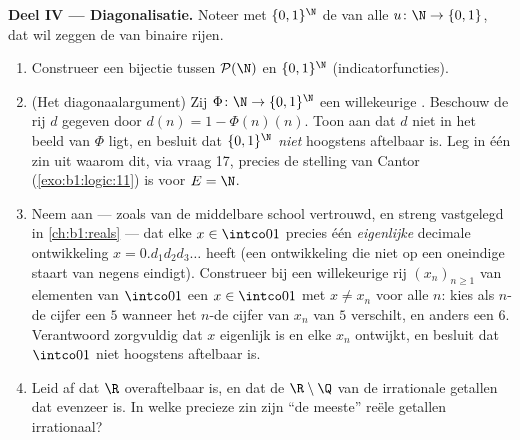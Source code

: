 \begin{problem}
\medskip
\noindent\textbf{Deel IV --- Diagonalisatie.} Noteer met
$\{0,1\}^{\N}$ de  van alle  $u \colon \N \to \{0,
1\}$, dat wil zeggen de  van binaire rijen.
\begin{enumerate}[resume]
  \item Construeer een bijectie tussen $\mathcal{P}(\N)$ en
        $\{0,1\}^{\N}$ (indicatorfuncties).
  \item (Het diagonaalargument) Zij $\Phi \colon \N \to \{0,1\}^{\N}$ een
        willekeurige . Beschouw de rij $d$ gegeven door $d(n) =
        1 - \Phi(n)(n)$. Toon aan dat $d$ niet in het beeld van $\Phi$
        ligt, en besluit dat $\{0,1\}^{\N}$ \emph{niet} hoogstens
        aftelbaar is. Leg in één zin uit waarom dit, via vraag 17,
        precies de stelling van Cantor (\cref{exo:b1:logic:11}) is voor
        $E = \N$.
  \item Neem aan --- zoals van de middelbare school vertrouwd, en
        streng vastgelegd in \cref{ch:b1:reals} --- dat elke $x \in
        \intco01$ precies één \emph{eigenlijke} decimale ontwikkeling $x
        = 0.d_1 d_2 d_3\dots$ heeft (een ontwikkeling die niet op een
        oneindige staart van negens eindigt). Construeer bij een
        willekeurige rij $(x_n)_{n \geq 1}$ van elementen van $\intco01$
        een $x \in \intco01$ met $x \neq x_n$ voor alle $n$: kies als
        $n$-de cijfer een $5$ wanneer het $n$-de cijfer van $x_n$ van $5$
        verschilt, en anders een $6$. Verantwoord zorgvuldig dat $x$
        eigenlijk is en elke $x_n$ ontwijkt, en besluit dat $\intco01$
        niet hoogstens aftelbaar is.
  \item Leid af dat $\R$ overaftelbaar is, en dat de  $\R
        \setminus \Q$ van de irrationale getallen dat evenzeer is. In
        welke precieze zin zijn ``de meeste'' reële getallen irrationaal?
\end{enumerate}


\end{problem}
